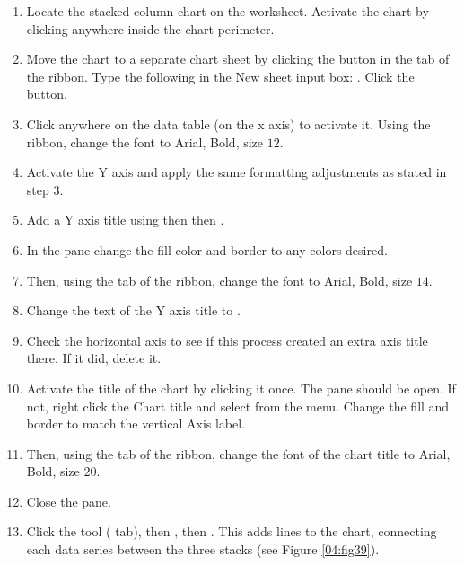 \begin{enumerate}
	\item Locate the  stacked column chart on the  worksheet. Activate the chart by clicking anywhere inside the chart perimeter.
	\item Move the chart to a separate chart sheet by clicking the  button in the  tab of the ribbon. Type the following in the New sheet input box: . Click the  button.
	\item Click anywhere on the data table (on the x axis) to activate it. Using the  ribbon, change the font to Arial, Bold, size $ 12 $.
	\item Activate the Y axis and apply the same formatting adjustments as stated in step $ 3 $. 
	\item Add a Y axis title using  then  then .
	\item In the  pane change the fill color and border to any colors desired.
	\item Then, using the  tab of the ribbon, change the font to Arial, Bold, size $ 14 $.
	\item Change the text of the Y axis title to .
	\item Check the horizontal axis to see if this process created an extra axis title there. If it did, delete it.
	\item Activate the title of the chart by clicking it once. The  pane should be open. If not, right click the Chart title and select  from the menu. Change the fill and border to match the vertical Axis label.
	\item Then, using the  tab of the ribbon, change the font of the chart title to Arial, Bold, size $ 20 $.
	\item Close the  pane.
	\item Click the  tool ( tab), then , then . This adds lines to the chart, connecting each data series between the three stacks (see Figure \ref{04:fig39}).
\end{enumerate}


